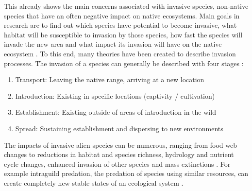 \documentclass[12pt,a4paper]{article}
\begin{document}
This already shows the main concerns associated with invasive species, non-native species that have an often negative impact on native ecosystems.
Main goals in research are to find out which species have potential to become invasive, what habitat will be susceptible to invasion by those species, how fast the species will invade the new area and what impact its invasion will have on the native ecosystem \cite{shigesada1997invasions}. 
To this end, many theories have been created to describe invasion processes.
The invasion of a species can  generally be described with four stages \cite{blackburn2011invasionstages}: 
\begin{enumerate}
    \item Transport: Leaving the native range, arriving at a new location
    \item Introduction: Existing in specific locations (captivity / cultivation)
    \item Establishment: Existing outside of areas of introduction in the wild
    \item Spread: Sustaining establishment and dispersing to new environments
\end{enumerate}

The impacts of invasive alien species can be numerous, ranging from food web changes to reductions in habitat and species richness, hydrology and nutrient cycle changes, enhanced invasion of other species and mass extinctions \cite{simberloff2013invasiveimpacts}.
For example intraguild predation, the predation of species using similar resources, can create completely new stable states of an ecological system \cite{polis1989theoryIGP}.
\end{document}
